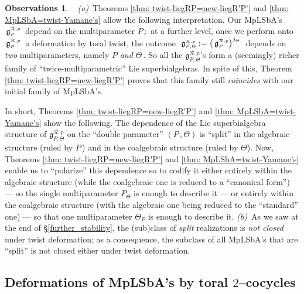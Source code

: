 \documentclass[12pt,reqno,twoside,a4paper]{amsart}
\numberwithin{equation}{section}
\theoremstyle{definition}
\newtheorem{free text}[lema]{}
\newtheorem{obs's}[lema]{Observations}
\theoremstyle{remark}
\newcommand{\R}{{\mathcal R}}
\def \Ppicc {{\scriptscriptstyle P}}
\def \Thetapicc {{\scriptscriptstyle \Theta}}
\def \lieg{\mathfrak{g}}
\def \liegRpP{\mathfrak{g}^{\raise1pt\hbox{$ \scriptscriptstyle \mathcal{R},p $}}_\Ppicc}
\theoremstyle{plain}
\begin{document}
\vskip7pt

\begin{obs's}  \label{obs: parameter_(P,Phi) x MpLbA's}  {\ }
%
 \vskip3pt
%
   \textit{(a)}\,  Theorems \ref{thm: twist-liegRP=new-liegR'P'}  and
   \ref{thm: MpLSbA=twist-Yamane's}  allow the following interpretation.
   Our MpLSbA's  $ \, \liegRpP \, $  depend on the multiparameter  $ P \, $;
   \,at a further level, once we perform onto  $ \, \liegRpP \, $  a deformation by
   toral twist, the outcome
   $ \; \lieg^{\scriptscriptstyle \R,p}_{\Ppicc,\Thetapicc} := {\big(\, \liegRpP \big)}^{j_\Theta} \; $  depends on  \textsl{two\/}  multiparameters, namely
   $ P $  \textsl{and\/}  $ \Theta \, $.  So all the
   $ \lieg^{\scriptscriptstyle \R,p}_{\Ppicc,\Thetapicc} $'s  form a
   (seemingly) richer family of
   ``twice-multiparametric'' Lie superbialgebras.
   In spite of this,  Theorem \ref{thm: twist-liegRP=new-liegR'P'}
   proves that this family still  \textsl{coincides\/}
   with our initial family of MpLSbA's.
                                                              \par
   In short,  Theorems \ref{thm: twist-liegRP=new-liegR'P'}  and
   \ref{thm: MpLSbA=twist-Yamane's}  show the following.  The dependence of the Lie
   superbialgebra structure of  $ \lieg^{\scriptscriptstyle \R , p}_{\Ppicc,\Thetapicc} $
   on the ``double parameter''  $ (P\,,\Theta) $  is ``split'' in the algebraic structure
   (ruled by  $ P \, $)  and in the coalgebraic structure (ruled by  $ \Theta $).
   Now,  Theorems \ref{thm: twist-liegRP=new-liegR'P'}  and  \ref{thm: MpLSbA=twist-Yamane's}
   enable us to ``polarize'' this dependence so to codify it either entirely
   within the algebraic structure (while the coalgebraic one is reduced to a ``canonical form'')
   --- so the single multiparameter  $ P_\Theta $  is enough to describe it ---
   or entirely within the coalgebraic structure (with the algebraic one being reduced
   to the ``standard'' one)   --- so that one multiparameter  $ \Theta_P $
   is enough to describe it.
%
 \vskip3pt
%
   \textit{(b)}\,  As we saw at the end of  \S \ref{further_stability},
   the (sub)class of  \textsl{split\/}
   realizations is  \textsl{not closed\/}  under twist deformation; as a consequence,
   the subclass of all MpLSbA's that are ``split'' is not closed either
   under twist deformation.
%
\end{obs's}

\medskip


\subsection{Deformations of MpLSbA's by toral  $ 2 $--cocycles}  \label{subsec: tor-2cocyc def's_mp-Lie_supbialg's}  {\ }
\end{document}
